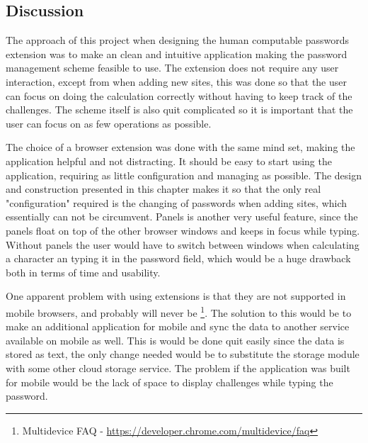 \subsection{Discussion}
The approach of this project when designing the human computable passwords extension was to make an clean and intuitive application making the password management scheme feasible to use. The extension does not require any user interaction, except from when adding new sites, this was done so that the user can focus on doing the calculation correctly without having to keep track of the challenges. The scheme itself is also quit complicated so it is important that the user can focus on as few operations as possible. 
\par The choice of a browser extension was done with the same mind set, making the application helpful and not distracting. It should be easy to start using the application, requiring as little configuration and managing as possible. The design and construction presented in this chapter makes it so that the only real "configuration" required is the changing of passwords when adding sites, which essentially can not be circumvent. Panels is another very useful feature, since the panels float on top of the other browser windows and keeps in focus while typing. Without panels the user would have to switch between windows when calculating a character an typing it in the password field, which would be a huge drawback both in terms of time and usability. 
\par One apparent problem with using extensions is that they are not supported in mobile browsers, and probably will never be \footnote{Multidevice FAQ - \url{https://developer.chrome.com/multidevice/faq}}. The solution to this would be to make an additional application for mobile and sync the data to another service available on mobile as well. This is would be done quit easily since the data is stored as text, the only change needed would be to substitute the storage module with some other cloud storage service. The problem if the application was built for mobile would be the lack of space to display challenges while typing the password. 






